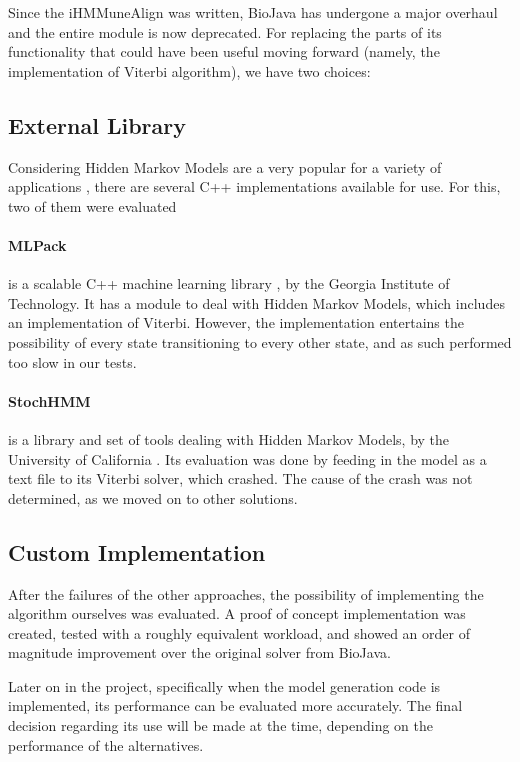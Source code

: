 \documentclass[a4paper,12pt]{report}
\begin{document}
Since the iHMMuneAlign was written, BioJava has undergone a major overhaul \autocite{biojava3} and the entire module is now deprecated. For replacing the parts of its functionality that could have been useful moving forward (namely, the implementation of Viterbi algorithm), we have two choices:

\subsection{External Library}
Considering Hidden Markov Models are a very popular for a variety of applications \autocite{hmm}, there are several C++ implementations available for use. For this, two of them were evaluated

\paragraph{MLPack} is a scalable C++ machine learning library \autocite{mlpack}, by the Georgia Institute of Technology. It has a module to deal with Hidden Markov Models, which includes an implementation of Viterbi. However, the implementation entertains the possibility of every state transitioning to every other state, and as such performed too slow in our tests.

\paragraph{StochHMM} is a library and set of tools dealing with Hidden Markov Models, by the University of California \autocite{stochhmm}. Its evaluation was done by feeding in the model as a text file to its Viterbi solver, which crashed. The cause of the crash was not determined, as we moved on to other solutions.

\subsection{Custom Implementation}
After the failures of the other approaches, the possibility of implementing the algorithm ourselves was evaluated. A proof of concept implementation was created, tested with a roughly equivalent workload, and showed an order of magnitude improvement over the original solver from BioJava.

Later on in the project, specifically when the model generation code is implemented, its performance can be evaluated more accurately. The final decision regarding its use will be made at the time, depending on the performance of the alternatives.
\end{document}
